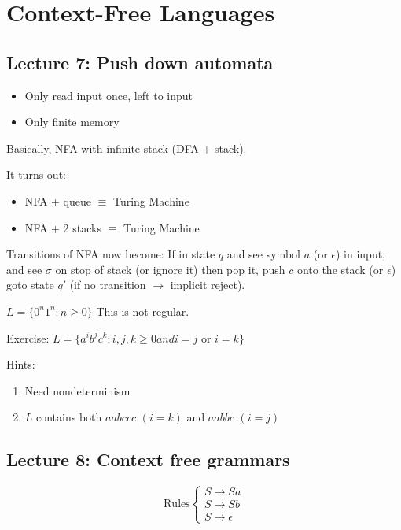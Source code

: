 \chapter{Context-Free Languages}

\section*{Lecture 7: Push down automata}

\begin{itemize}
    \item Only read input once, left to input
    \item Only finite memory
\end{itemize}

Basically, NFA with infinite stack (DFA + stack).

It turns out:
\begin{itemize}
    \item NFA + queue $\equiv$ Turing Machine
    \item NFA + 2 stacks $\equiv$ Turing Machine
\end{itemize}

Transitions of NFA now become: If in state $q$ and see symbol $a$ (or $\epsilon$) in input, and see $\sigma$ on stop of stack (or ignore it) then pop it, push $c$ onto the stack (or $\epsilon$) goto state $q'$ (if no transition $\rightarrow$ implicit reject).

\begin{example}[2.14 in text]
    $L = \{0^n1^n: n \geq 0\}$ This is not regular.
\end{example}

Exercise: $L = \{a^i b^j c^k: i, j, k \geq 0 and i = j \text{ or } i = k\}$

Hints:

\begin{enumerate}
  \item Need nondeterminism
  \item $L$ contains both $aabccc$ $(i = k)$ and $aabbc$ $(i = j)$
\end{enumerate}

\section*{Lecture 8: Context free grammars}

\begin{equation*}
    \text{Rules}
    \left\{
        \begin{array}{lr}
            S \rightarrow Sa \\
            S \rightarrow Sb \\
            S \rightarrow \epsilon
        \end{array}
    \right.
\end{equation*}


